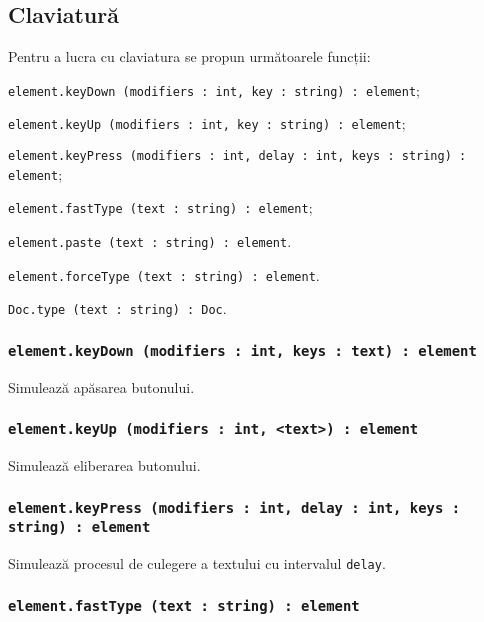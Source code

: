 \subsection{Claviatură}

Pentru a lucra cu claviatura se propun următoarele funcții:
\begin{icItems}
	\item \texttt{element.keyDown (modifiers : int, key : string) : element};
	\item \texttt{element.keyUp (modifiers : int, key : string) : element};
	\item \texttt{element.keyPress (modifiers : int, delay : int, keys : string) : element};
	\item \texttt{element.fastType (text : string) : element};
	\item \texttt{element.paste (text : string) : element}.
	\item \texttt{element.forceType (text : string) : element}.
	\item \texttt{Doc.type (text : string) : Doc}.
\end{icItems}

\subsubsection{\texttt{element.keyDown (modifiers : int, keys : text) : element}}

Simulează apăsarea butonului.

\subsubsection{\texttt{element.keyUp (modifiers : int, <text>) : element}}

Simulează eliberarea butonului.

\subsubsection{\texttt{element.keyPress (modifiers : int, delay : int, keys : string) : element}}

Simulează procesul de culegere a textului cu intervalul \texttt{delay}.

\subsubsection{\texttt{element.fastType (text : string) : element}}

